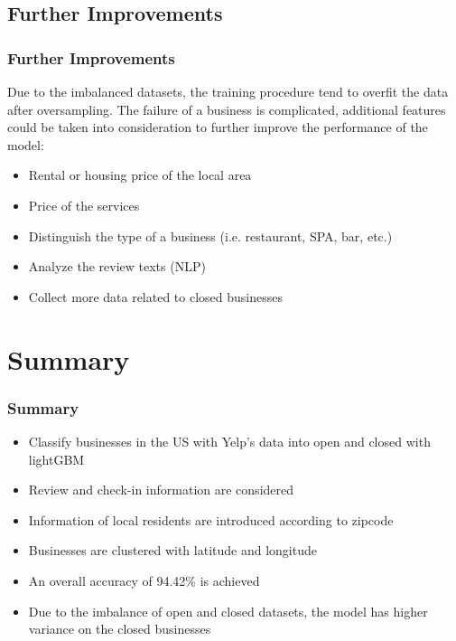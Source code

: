 \documentclass{beamer}
\begin{document}
\subsection{Further Improvements}
\begin{frame}
\frametitle{Further Improvements}
Due to the imbalanced datasets, the training procedure tend to overfit the data after oversampling. The failure of a business is complicated, additional features could be taken into consideration to further improve the performance of the model:\vspace{1em}

\begin{itemize}
	\item Rental or housing price of the local area
	\item Price of the services
	\item Distinguish the type of a business (i.e. restaurant, SPA, bar, etc.)
	\item Analyze the review texts (NLP)
	\item Collect more data related to closed businesses
\end{itemize}
 
\end{frame}
\section{Summary}
\begin{frame}
\frametitle{Summary}
\begin{itemize}
	\item Classify businesses in the US with Yelp's data into open and closed with lightGBM
	\item Review and check-in information are considered
	\item Information of local residents are introduced according to zipcode
	\item Businesses are clustered with latitude and longitude 
	\item An overall accuracy of 94.42\% is achieved
	\item Due to the imbalance of open and closed datasets, the model has higher variance on the closed businesses 
\end{itemize}
\end{frame}
\end{document}
